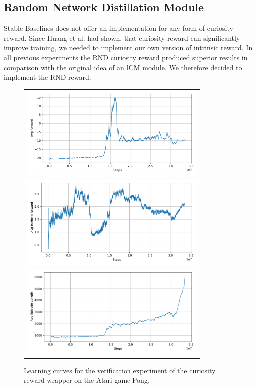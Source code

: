 \subsection{Random Network Distillation Module} \label{sec:blRND}
Stable Baselines does not offer an implementation for any form of curiosity reward. Since Huang et al. had shown, that curiosity reward can significantly improve training, we needed to implement our own version of intrinsic reward. In all previous experiments the RND curiosity reward produced superior results in comparison with the original idea of an ICM module. We therefore decided to implement the RND reward. 

\begin{figure}[ht]
    \begin{center}
    \begin{tabular}{c}
    \includegraphics[clip, height=4.5cm]{figures/implementation/rnd_pong_episode_reward.pdf} \\
    \includegraphics[clip, height=4.5cm]{figures/implementation/rnd_pong_episode_intrinsic_reward.pdf} \\
    \includegraphics[clip, height=4.5cm]{figures/implementation/rnd_pong_episode_length.pdf} \\
    
    \end{tabular}
    \end{center}
    \caption[RND on Pong]{Learning curves for the verification experiment of the curiosity reward wrapper on the Atari game Pong.}
    \label{fig:RNDPong}
  \end{figure}


